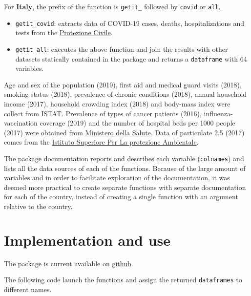 \documentclass[12pt,halfline,a4paper,]{ouparticle}
\providecommand{\tightlist}{%
  \setlength{\itemsep}{0pt}\setlength{\parskip}{0pt}}
\begin{document}
For \textbf{Italy}, the prefix of the function is \texttt{getit\_}
followed by \texttt{covid} or \texttt{all}.

\begin{itemize}
\tightlist
\item
  \texttt{getit\_covid}: extracts data of COVID-19 cases, deaths,
  hospitalizations and tests from the
  \href{\%22https://raw.githubusercontent.com/pcm-dpc/COVID-19/master/dati-regioni/dpc-covid19-ita-regioni.csv\%22}{Protezione
  Civile}.
\item
  \texttt{getit\_all}: executes the above function and join the results
  with other datasets statically contained in the package and returns a
  \texttt{dataframe} with 64 variables.
\end{itemize}

Age and sex of the population (2019), first aid and medical guard visits
(2018), smoking status (2018), prevalence of chronic conditions (2018),
annual-household income (2017), household crowding index (2018) and
body-mass index were collect from
\href{http://dati.istat.it/?lang=en}{ISTAT}. Prevalence of types of
cancer patients (2016), influenza-vaccination coverage (2019) and the
number of hospital beds per 1000 people (2017) were obtained from
\href{http://www.dati.salute.gov.it/}{Ministero della Salute}. Data of
particulate 2.5 (2017) comes from the
\href{https://annuario.isprambiente.it/pon/basic/14}{Istituto Superiore
Per La protezione Ambientale}.

The package documentation reports and describes each variable
(\texttt{colnames}) and lists all the data sources of each of the
functions. Because of the large amount of variables and in order to
facilitate exploration of the documentation, it was deemed more
practical to create separate functions with separate documentation for
each of the country, instead of creating a single function with an
argument relative to the country.

\hypertarget{implementation-and-use}{%
\section{Implementation and use}\label{implementation-and-use}}

The package is current available on
\href{https://github.com/c1au6i0/covid19census}{github}.

The following code launch the functions and assign the returned
\texttt{dataframes} to different names.

\bigskip
\end{document}
